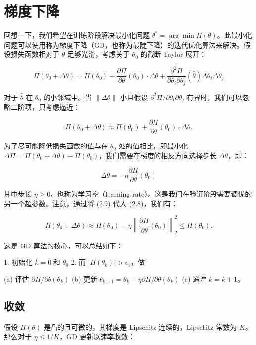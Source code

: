 \section{梯度下降}

回想一下，我们希望在训练阶段解决最小化问题 $\theta^* = \arg\min \Pi(\theta)$。此最小化问题可以使用称为梯度下降（GD，也称为最陡下降）的迭代优化算法来解决。假设损失函数相对于 $\theta$ 足够光滑，考虑关于 $\theta_0$ 的截断 Taylor 展开：

\[
\Pi(\theta_0 + \Delta \theta) = \Pi(\theta_0) + \frac{\partial \Pi}{\partial \theta}(\theta_0) \cdot \Delta \theta + \frac{\partial^2 \Pi}{\partial \theta_i \partial \theta_j}(\hat{\theta}) \Delta \theta_i \Delta \theta_j
\]

对于 $\hat{\theta}$ 在 $\theta_0$ 的小邻域中。当 $\| \Delta \theta \|$ 小且假设 $\partial^2 \Pi / \partial \theta_i \partial \theta_j$ 有界时，我们可以忽略二阶项，只考虑逼近：

\[
\Pi(\theta_0 + \Delta \theta) \approx \Pi(\theta_0) + \frac{\partial \Pi}{\partial \theta}(\theta_0) \cdot \Delta \theta.
\]

为了尽可能降低损失函数的值与在 $\theta_0$ 处的值相比，即最小化 $\Delta \Pi = \Pi(\theta_0 + \Delta \theta) - \Pi(\theta_0)$，我们需要在梯度的相反方向选择步长 $\Delta \theta$，即：

\[
\Delta \theta = - \eta \frac{\partial \Pi}{\partial \theta}(\theta_0)
\]

其中步长 $\eta \geq 0$，也称为学习率（learning rate）。这是我们在验证阶段需要调优的另一个超参数。注意，通过将 (2.9) 代入 (2.8)，我们有：

\[
\Pi(\theta_0 + \Delta \theta) \approx \Pi(\theta_0) - \eta \left\| \frac{\partial \Pi}{\partial \theta}(\theta_0) \right\|_2^2 \leq \Pi(\theta_0).
\]

这是 GD 算法的核心，可以总结如下：

1. 初始化 $k=0$ 和 $\theta_0$
2. 而 $| \Pi(\theta_k) | > \epsilon_1$，做

(a) 评估 $\partial \Pi / \partial \theta (\theta_k)$
(b) 更新 $\theta_{k+1} = \theta_k - \eta \partial \Pi / \partial \theta (\theta_k)$
(c) 递增 $k = k+1$。

\subsection{收敛}

假设 $\Pi(\theta)$ 是凸的且可微的，其梯度是 Lipschitz 连续的，Lipschitz 常数为 $K$。那么对于 $\eta \leq 1/K$，GD 更新以速率收敛：

